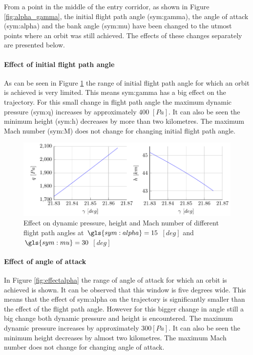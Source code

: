 From a point in the middle of the entry corridor, as shown in Figure \ref{fig:alpha_gamma}, the initial flight path angle (\gls{sym:gamma}), the angle of attack (\gls{sym:alpha}) and the bank angle (\gls{sym:mu}) have been changed to the utmost points where an orbit was still achieved. The effects of these changes separately are presented below.

\paragraph{Effect of initial flight path angle}
As can be seen in Figure \ref{fig:effectgamma} the range of initial flight path angle for which an orbit is achieved is very limited. This means \gls{sym:gamma} has a big effect on the trajectory. For this small change in flight path angle the maximum dynamic pressure (\gls{sym:q}) increases by approximately $400$ $\left[Pa\right]$. It can also be seen the minimum height (\gls{sym:h}) decreases by more than two kilometres. The maximum Mach number (\gls{sym:M}) does not change for changing initial flight path angle.

\begin{figure}[h]
	\centering
	\includegraphics[width=\textwidth]{./Figure/orbit/effectgamma2.pdf}
	\caption[Effect on dynamic pressure, height and Mach number of different flight path angles]{Effect on dynamic pressure, height and Mach number of different flight path angles at $\gls{sym:alpha}=15$ $\left[deg\right]$ and $\gls{sym:mu}=30$ $\left[deg\right]$}
	\label{fig:effectgamma}
\end{figure}

\paragraph{Effect of angle of attack}

In Figure \ref{fig:effectalpha} the range of angle of attack for which an orbit is achieved is shown. It can be observed that this window is five degrees wide. This means that the effect of \gls{sym:alpha} on the trajectory is significantly smaller than the effect of the flight path angle. However for this bigger change in angle still a big change both dynamic pressure and height is encountered. The maximum dynamic pressure increases by approximately $300 \left[Pa\right]$. It can also be seen the minimum height decreases by almost two kilometres. The maximum Mach number does not change for changing angle of attack.

